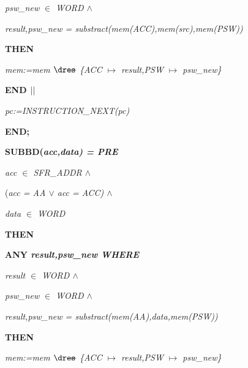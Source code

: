 \begin{sloppypar}
\hspace*{0.30in}\it psw\_new $\in$  \it WORD  $\land$ 

\hspace*{0.30in}\it result\rm ,\it psw\_new \rm = \it substract\rm (\it mem\rm (\it ACC\rm )\rm ,\it mem\rm (\it src\rm )\rm ,\it mem\rm (\it PSW\rm )\rm )

\hspace*{0.20in}\bf THEN

\hspace*{0.30in}\it mem\rm :=\it mem $\lover$ \rm \{\it ACC $\mapsto$ \it result\rm ,\it PSW $\mapsto$ \it psw\_new\rm \}

\hspace*{0.20in}\bf END  $\mbox{$\mid\mid$}$ 

\hspace*{0.20in}\it pc\rm :=\it INSTRUCTION\_NEXT\rm (\it pc\rm )

\hspace*{0.10in}\bf END\rm ;

\hspace*{0.10in}\bf SUBBD\rm (\it acc\rm ,\it data\rm ) \rm = \bf PRE

\hspace*{0.20in}\it acc $\in$  \it SFR\_ADDR  $\land$ 

\hspace*{0.20in}\rm (\it acc \rm = \it AA  $\lor$  \it acc \rm = \it ACC\rm )  $\land$ 

\hspace*{0.20in}\it data $\in$  \it WORD

\hspace*{0.10in}\bf THEN

\hspace*{0.20in}\bf ANY \it result\rm ,\it psw\_new \bf WHERE

\hspace*{0.30in}\it result $\in$  \it WORD  $\land$ 

\hspace*{0.30in}\it psw\_new $\in$  \it WORD  $\land$ 

\hspace*{0.30in}\it result\rm ,\it psw\_new \rm = \it substract\rm (\it mem\rm (\it AA\rm )\rm ,\it data\rm ,\it mem\rm (\it PSW\rm )\rm )

\hspace*{0.20in}\bf THEN

\hspace*{0.30in}\it mem\rm :=\it mem $\lover$ \rm \{\it ACC $\mapsto$ \it result\rm ,\it PSW $\mapsto$ \it psw\_new\rm \}


\end{sloppypar}
